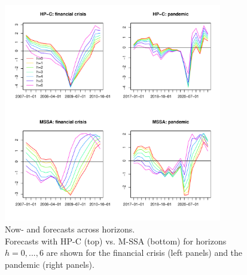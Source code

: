 \documentclass[11pt,a4paper]{article}
\begin{document}
\begin{figure}[H]
    \begin{center}
        \includegraphics[width=0.85\textwidth]{./Figures/multivar_vs_univar.pdf}
        \caption{Now- and forecasts across horizons.\\ Forecasts with HP-C (top) vs. M-SSA (bottom) for horizons $h=0,...,6$ are shown for the financial crisis (left panels) and the pandemic (right panels).
        \label{fig:multivar_vs_univar}}
    \end{center}
\end{figure}
\end{document}
